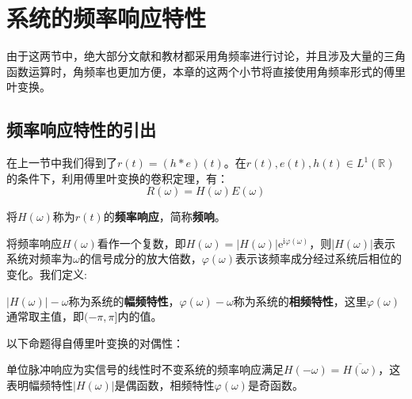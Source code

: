 \section{系统的频率响应特性}\label{sec:Freq_Response}

由于这两节中，绝大部分文献和教材都采用角频率进行讨论，并且涉及大量的三角函数运算时，角频率也更加方便，本章的这两个小节将直接使用角频率形式的傅里叶变换。

\subsection{频率响应特性的引出}\label{sub:freq_response}
在上一节中我们得到了$r(t)=(h*e)(t)$。在$r(t),e(t),h(t)\in L^1(\mathbb{R})$的条件下，利用傅里叶变换的卷积定理，有：
\[R(\omega)=H(\omega)E(\omega)\]
\begin{definition}[频率响应]
    将$H(\omega)$称为$r(t)$的\textbf{频率响应}，简称\textbf{频响}。
\end{definition}

将频率响应$H(\omega)$看作一个复数，即$H(\omega)=\left|H(\omega)\right|\mathrm{e}^{\mathrm{i}\varphi(\omega)}$，则$\left|H(\omega)\right|$表示系统对频率为$\omega$的信号成分的放大倍数，$\varphi(\omega)$表示该频率成分经过系统后相位的变化。我们定义:
\begin{definition}[幅频特性和相频特性]
    $\left|H(\omega)\right|-\omega$称为系统的\textbf{幅频特性}，$\varphi(\omega)-\omega$称为系统的\textbf{相频特性}，这里$\varphi(\omega)$通常取主值，即$(-\pi,\pi]$内的值。
\end{definition}

以下命题得自傅里叶变换的对偶性：
\begin{proposition}
    单位脉冲响应为实信号的线性时不变系统的频率响应满足$H(-\omega)=\overline{H(\omega)}$，这表明幅频特性$\left|H(\omega)\right|$是偶函数，相频特性$\varphi(\omega)$是奇函数。
\end{proposition}

